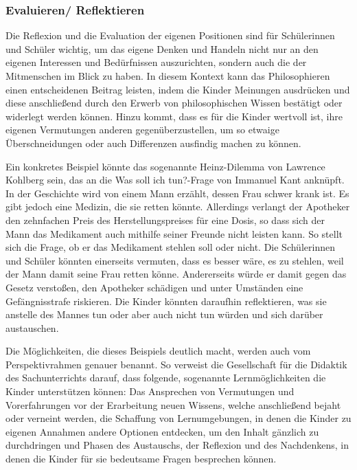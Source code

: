 \subsubsection{Evaluieren/ Reflektieren}


Die Reflexion und die Evaluation der eigenen Positionen sind für Schülerinnen und Schüler wichtig, um das eigene Denken und Handeln nicht nur an den eigenen Interessen und Bedürfnissen auszurichten, sondern auch die der Mitmenschen im Blick zu haben. 
In diesem Kontext kann das Philosophieren einen entscheidenen Beitrag leisten, indem die Kinder Meinungen ausdrücken und diese anschließend durch den Erwerb von philosophischen Wissen bestätigt oder widerlegt werden können. 
Hinzu kommt, dass es für die Kinder wertvoll ist, ihre eigenen Vermutungen anderen gegenüberzustellen, um so etwaige Überschneidungen oder auch Differenzen ausfindig machen zu können. 

Ein konkretes Beispiel könnte das sogenannte \glqq Heinz-Dilemma\grqq{} von Lawrence Kohlberg sein, das an die \glqq Was soll ich tun?\grqq{}-Frage von Immanuel Kant anknüpft. 
In der Geschichte wird von einem Mann erzählt, dessen Frau schwer krank ist. 
Es gibt jedoch eine Medizin, die sie retten könnte.
 Allerdings verlangt der Apotheker den zehnfachen Preis des Herstellungspreises für eine Dosis, so dass sich der Mann das Medikament auch mithilfe seiner Freunde nicht leisten kann. 
 So stellt sich die Frage, ob er das Medikament stehlen soll oder nicht. 
 Die Schülerinnen und Schüler könnten einerseits vermuten, dass es besser wäre, es zu stehlen, weil der Mann damit seine Frau retten könne.
 Andererseits würde er damit gegen das Gesetz verstoßen, den Apotheker schädigen und unter Umständen eine Gefängnisstrafe riskieren. 
 Die Kinder könnten daraufhin reflektieren, was sie anstelle des Mannes tun oder aber auch nicht tun würden und sich darüber austauschen.

Die Möglichkeiten, die dieses Beispiels deutlich macht, werden auch vom Perspektivrahmen genauer benannt.
So verweist die Gesellschaft für die Didaktik des Sachunterrichts darauf, dass folgende, sogenannte \glqq Lernmöglichkeiten\grqq{} die Kinder unterstützen können:
Das Ansprechen von \glqq Vermutungen und Vorerfahrungen vor der Erarbeitung neuen Wissens\grqq{}\cite[S.\,23]{GDS13}, welche anschließend bejaht oder verneint werden, die Schaffung von Lernumgebungen, in denen die Kinder zu eigenen Annahmen andere Optionen entdecken, um den Inhalt gänzlich zu durchdringen und Phasen des Austauschs, der Reflexion und des Nachdenkens, in denen die Kinder für sie bedeutsame Fragen besprechen können.

